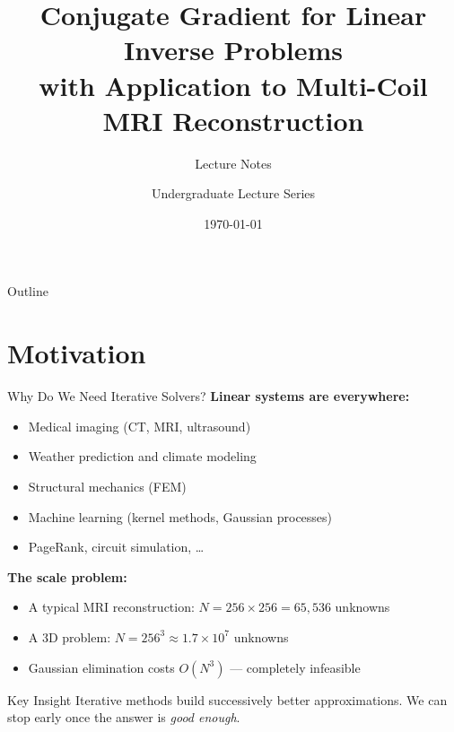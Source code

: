 \documentclass[aspectratio=169]{beamer}
\title[CG for Inverse Problems \& MRI]{%
    Conjugate Gradient for Linear Inverse Problems\\
    with Application to Multi-Coil MRI Reconstruction}
\subtitle{Lecture Notes}
\author{Undergraduate Lecture Series}
\institute{Department of Electrical Engineering \& Computer Science}
\date{\today}
\begin{document}
\begin{frame}
    \titlepage
\end{frame}

\begin{frame}{Outline}
    \tableofcontents
\end{frame}

\section{Motivation}

\begin{frame}{Why Do We Need Iterative Solvers?}
    \textbf{Linear systems are everywhere:}
    \begin{itemize}
        \item Medical imaging (CT, MRI, ultrasound)
        \item Weather prediction and climate modeling
        \item Structural mechanics (FEM)
        \item Machine learning (kernel methods, Gaussian processes)
        \item PageRank, circuit simulation, \ldots
    \end{itemize}

    \pause
    \vspace{0.5cm}
    \textbf{The scale problem:}
    \begin{itemize}
        \item A typical MRI reconstruction: $N = 256 \times 256 = 65{,}536$ unknowns
        \item A 3D problem: $N = 256^3 \approx 1.7 \times 10^7$ unknowns
        \item Gaussian elimination costs $O(N^3)$ --- completely infeasible
    \end{itemize}

    \pause
    \vspace{0.3cm}
    \begin{block}{Key Insight}
        Iterative methods build successively better approximations.
        We can stop early once the answer is \emph{good enough}.
    \end{block}
\end{frame}
\end{document}
